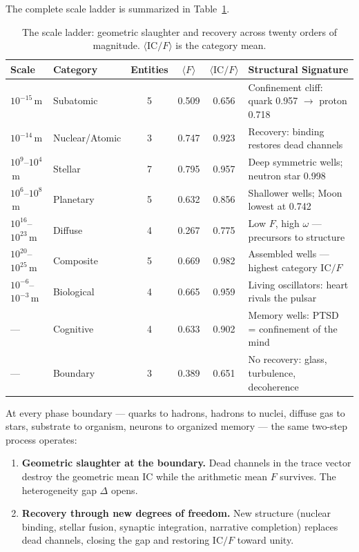 \documentclass[
  aps,
  prd,
  twocolumn,
  superscriptaddress,
  nofootinbib,
  floatfix
]{revtex4-2}
\newcommand{\IC}{\mathrm{IC}}
\begin{document}
The complete scale ladder is summarized in
Table~\ref{tab:ladder}.

\clearpage
\begin{table}[t]
\caption{\label{tab:ladder}The scale ladder: geometric
slaughter and recovery across twenty orders of magnitude.
$\langle \IC/F \rangle$ is the category mean.}
\begin{ruledtabular}
\begin{tabular}{llcccl}
Scale & Category & Entities & $\langle F \rangle$ &
  $\langle \IC/F \rangle$ & Structural Signature \\
\hline
$10^{-15}$\,m & Subatomic &
  5 & 0.509 & 0.656 &
  Confinement cliff: quark 0.957 $\to$ proton 0.718 \\
$10^{-14}$\,m & Nuclear/Atomic &
  3 & 0.747 & 0.923 &
  Recovery: binding restores dead channels \\
$10^{9}$--$10^{4}$\,m & Stellar &
  7 & 0.795 & 0.957 &
  Deep symmetric wells; neutron star 0.998 \\
$10^{6}$--$10^{8}$\,m & Planetary &
  5 & 0.632 & 0.856 &
  Shallower wells; Moon lowest at 0.742 \\
$10^{16}$--$10^{23}$\,m & Diffuse &
  4 & 0.267 & 0.775 &
  Low $F$, high $\omega$ --- precursors to structure \\
$10^{20}$--$10^{25}$\,m & Composite &
  5 & 0.669 & 0.982 &
  Assembled wells --- highest category $\IC/F$ \\
$10^{-6}$--$10^{-3}$\,m & Biological &
  4 & 0.665 & 0.959 &
  Living oscillators: heart rivals the pulsar \\
--- & Cognitive &
  4 & 0.633 & 0.902 &
  Memory wells: PTSD = confinement of the mind \\
--- & Boundary &
  3 & 0.389 & 0.651 &
  No recovery: glass, turbulence, decoherence \\
\end{tabular}
\end{ruledtabular}
\end{table}

At every phase boundary --- quarks to hadrons, hadrons to
nuclei, diffuse gas to stars, substrate to organism, neurons
to organized memory --- the same two-step process operates:

\begin{enumerate}
\item \textbf{Geometric slaughter at the boundary.}
  Dead channels in the trace vector destroy the geometric
  mean $\IC$ while the arithmetic mean $F$ survives.  The
  heterogeneity gap $\Delta$ opens.
\item \textbf{Recovery through new degrees of freedom.}
  New structure (nuclear binding, stellar fusion, synaptic
  integration, narrative completion) replaces dead channels,
  closing the gap and restoring $\IC/F$ toward unity.
\end{enumerate}
\end{document}

